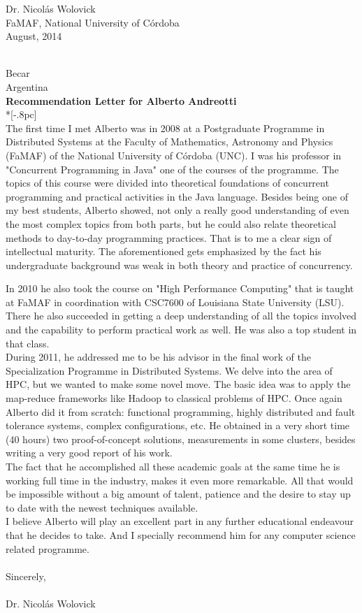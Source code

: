 \documentclass[letter,12pt,english]{article}
\begin{document}
{
\raggedleft{}
Dr. Nicol\'as Wolovick \\
FaMAF, National University of C\'ordoba \\
August, 2014 \\
}

{ \hfill \\ 
Becar\\
Argentina\\


\large
\bf Recommendation Letter for Alberto Andreotti} \\*[-.8pc]
\\

The first time I met Alberto was in 2008 at a Postgraduate Programme in Distributed Systems at the Faculty of Mathematics, Astronomy and Physics (FaMAF) of the National University of Córdoba (UNC). I was his professor in "Concurrent Programming in Java" one of the courses of the programme.
The topics of this course were divided into theoretical foundations of concurrent programming and practical activities in the Java language. Besides being one of my best students, Alberto showed, not only a really good understanding of even the most complex topics from both parts, but he could also relate theoretical methods to day-to-day programming practices. That is to me a clear sign of intellectual maturity. The aforementioned gets emphasized by the fact his undergraduate background was weak in both theory and practice of concurrency.

In 2010 he also took the course on "High Performance Computing" that is taught at FaMAF in coordination with CSC7600 of Louisiana State University (LSU). There he also succeeded in getting a deep understanding of all the topics involved and the capability to perform practical work as well. He was also a top student in that class.
\\
During 2011, he addressed me to be his advisor in the final work of the Specialization Programme in Distributed Systems. We delve into the area of HPC, but we wanted to make some novel move. The basic idea was to apply the map-reduce frameworks like Hadoop to classical problems of HPC. Once again Alberto did it from scratch: functional programming, highly distributed and fault tolerance systems, complex configurations, etc. He obtained in a very short time (40 hours) two proof-of-concept solutions, measurements in some clusters, besides writing a very good report of his work.
\\
The fact that he accomplished all these academic goals at the same time he is working full time in the industry, makes it even more remarkable. All that would be impossible without a big amount of talent, patience and the desire to stay up to date with the newest techniques available.
\\
I believe Alberto will play an excellent part in any further educational endeavour that he decides to take. And I specially recommend him for any computer science related programme.
\\
\\
Sincerely, 
\\
\\
Dr. Nicol\'as Wolovick
\end{document}
